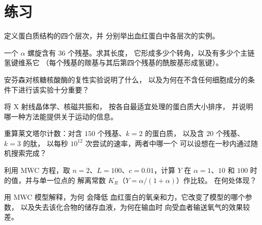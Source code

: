 \section{练习}

\begin{exercise}[$\star$]\label{exo:b3:structural-biology:1}
定义蛋白质结构的四个层次，并
分别举出血红蛋白中各层次的实例。
\end{exercise}

\begin{exercise}[$\star$]\label{exo:b3:structural-biology:2}
一个 $\alpha$ 螺旋含有 $36$ 个残基。求其长度，
它形成多少个转角，以及有多少个主链氢键维系它
（每个残基的羰基与其后第四个残基的酰胺基形成氢键）。
\end{exercise}

\begin{exercise}[$\star$]\label{exo:b3:structural-biology:3}
安芬森对核糖核酸酶的复性实验说明了什么，
以及为何在不含任何细胞成分的条件下进行该实验十分重要？
\end{exercise}

\begin{exercise}[$\star$]\label{exo:b3:structural-biology:4}
将 X 射线晶体学、核磁共振和，
按各自最适宜处理的蛋白质大小排序，
并说明哪一种方法能提供关于运动的信息。
\end{exercise}

\begin{exercise}[$\star\star$]\label{exo:b3:structural-biology:5}
重算莱文塔尔计数：对含 $150$ 个残基、$k = 2$ 的蛋白质，
以及含 $20$ 个残基、$k = 3$ 的肽，
以每秒 $10^{12}$ 次尝试的速率，两者中哪一个
可以设想在一秒内通过随机搜索完成？
\end{exercise}

\begin{exercise}[$\star\star$]\label{exo:b3:structural-biology:6}
利用 MWC 方程，取 $n = 2$、$L = 100$、$c = 0.01$，计算
$Y$ 在 $\alpha = 1$、$10$ 和 $100$ 时的值，并与单一位点的
解离常数 $K_{R}$（$Y = \alpha/(1+\alpha)$）作比较。
在何处体现？
\end{exercise}

\begin{exercise}[$\star\star$]\label{exo:b3:structural-biology:7}
用 MWC 模型解释，为何 会降低
血红蛋白的氧亲和力，它改变了模型的哪个参数，
以及失去该化合物的储存血液，为何在输血时
向受血者输送氧气的效果较差。
\end{exercise}

